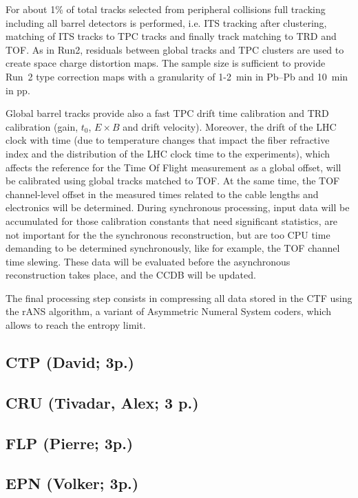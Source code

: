 For about 1\% of total tracks selected from peripheral collisions
full tracking including all
barrel detectors is performed, i.e. ITS tracking after clustering,
matching of ITS tracks to TPC tracks
and finally track matching to TRD and TOF. As in Run2, residuals
between
global tracks and TPC clusters are used to create space charge
distortion maps. The sample size is sufficient to provide
Run~2 type correction maps with a granularity of  1-2~min in Pb--Pb and 10~min
in pp.


Global barrel tracks provide also a fast TPC drift
time calibration and TRD calibration (gain, $t_0$, $E \times B$ and drift
velocity). Moreover, the drift of the LHC clock with time (due to temperature
changes that impact the fiber refractive index and the distribution of the LHC clock time to the experiments), which affects the
reference for the Time Of Flight measurement as a global offset,
will be calibrated using global tracks matched to TOF. At the same
time, the TOF channel-level offset in the measured times related to
the cable lengths and electronics will be determined.
During  synchronous processing, input data will be accumulated
for those calibration constants that need significant statistics, are not
important for the the synchronous reconstruction, but are too CPU time demanding to be determined synchronously, like for example, the TOF channel time
slewing. These data will be evaluated before the asynchronous
reconstruction takes place, and the CCDB will be updated.


The final processing step consists in compressing all data stored in the CTF using the rANS algorithm, a variant of
Asymmetric Numeral System coders, which allows to reach the entropy limit.
\subsection{CTP (David; 3p.)}


\subsection{CRU (Tivadar, Alex; 3 p.)}

\subsection{FLP (Pierre; 3p.)}
\label{sec:flp}


\subsection{EPN (Volker; 3p.)}
\label{sec:epn}

